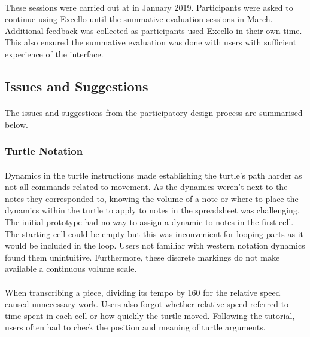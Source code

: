 \paragraph{} These sessions were carried out at in January 2019. Participants were asked to continue using Excello until the summative evaluation sessions in March. Additional feedback was collected as participants used Excello in their own time. This also ensured the summative evaluation was done with users with sufficient experience of the interface.

\subsection{Issues and Suggestions}

\paragraph{} The issues and suggestions from the participatory design process are summarised below.

\subsubsection{Turtle Notation}

\paragraph{} Dynamics in the turtle instructions made establishing the turtle's path harder as not all commands related to movement. As the dynamics weren't next to the notes they corresponded to, knowing the volume of a note or where to place the dynamics within the turtle to apply to notes in the spreadsheet was challenging. The initial prototype had no way to assign a dynamic to notes in the first cell. The starting cell could be empty but this was inconvenient for looping parts as it would be included in the loop. Users not familiar with western notation dynamics found them unintuitive. Furthermore, these discrete markings do not make available a continuous volume scale.

\paragraph{} When transcribing a piece, dividing its tempo by 160 for the relative speed caused unnecessary work. Users also forgot whether relative speed referred to time spent in each cell or how quickly the turtle moved. Following the tutorial, users often had to check the position and meaning of turtle arguments.


